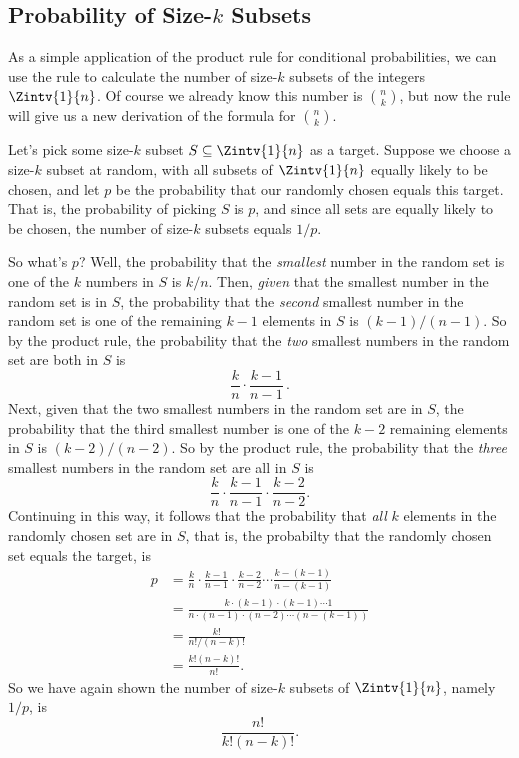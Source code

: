 \subsection{Probability of Size-$k$ Subsets}
As a simple application of the product rule for conditional
probabilities, we can use the rule to calculate the number of size-$k$
subsets of the integers $\Zintv{1}{n}$.  Of course we already know
this number is $\binom{n}{k}$, but now the rule will give us a new
derivation of the formula for $\binom{n}{k}$.

Let's pick some size-$k$ subset $S \subseteq \Zintv{1}{n}$ as a
target.  Suppose we choose a size-$k$ subset at random, with all
subsets of $\Zintv{1}{n}$ equally likely to be chosen, and let $p$ be
the probability that our randomly chosen equals this target.  That is,
the probability of picking $S$ is $p$, and since all sets are equally
likely to be chosen, the number of size-$k$ subsets equals $1/p$.

So what's $p$?  Well, the probability that the \emph{smallest} number
in the random set is one of the $k$ numbers in $S$ is $k/n$.  Then,
\emph{given} that the smallest number in the random set is in $S$, the
probability that the \emph{second} smallest number in the random set
is one of the remaining $k-1$ elements in $S$ is $(k-1)/(n-1)$.  So by
the product rule, the probability that the \emph{two} smallest numbers
in the random set are both in $S$ is
\[
\frac{k}{n} \cdot \frac{k-1}{n-1}\, .
\]
Next, given that the two smallest numbers in the random set are in
$S$, the probability that the third smallest number is one of the
$k-2$ remaining elements in $S$ is $(k-2)/(n-2)$.  So by the product
rule, the probability that the \emph{three} smallest numbers in the
random set are all in $S$ is
\[
\frac{k}{n} \cdot \frac{k-1}{n-1} \cdot \frac{k-2}{n-2}.
\]
Continuing in this way, it follows that the probability that
\emph{all} $k$ elements in the randomly chosen set are in $S$, that
is, the probabilty that the randomly chosen set equals the target, is
\begin{align*}
p & = \frac{k}{n} \cdot \frac{k-1}{n-1} \cdot \frac{k-2}{n-2}
              \cdots \frac{k-(k-1)}{n-(k-1)}\\
  & = \frac{k \cdot (k-1) \cdot (k-1) \cdots 1}%
           {n \cdot (n-1) \cdot (n-2) \cdots (n-(k-1))}\\
  & = \frac{k!}{n!/(n-k)!}\\
  & = \frac{k!(n-k)!}{n!}.
\end{align*}
So we have again shown the number of size-$k$ subsets of $\Zintv{1}{n}$,
namely $1/p$, is
\[
\frac{n!}{k!(n-k)!}.
\]


